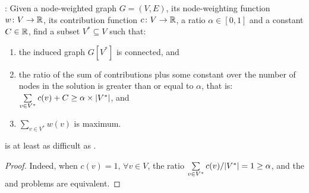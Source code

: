		\textbf{\rbmwcs{}}: Given a node-weighted graph $G = (V, E)$, its node-weighting function $w\colon V \to \mathbb{R}$, its contribution function $c\colon V \to \mathbb{R}$, a ratio $\alpha \in [0,1]$ and a constant $C \in \mathbb{R}$, find a subset $V^* \subseteq V$ such that:
			\begin{enumerate}
				\item the induced graph $G\left[V^*\right]$ is connected, and
				\item the ratio of the sum of contributions plus some constant over the number of nodes in the solution is greater than or equal to $\alpha$, that is:\\
					$\sum\limits_{v \in V^*}{c(v)} + C \geq \alpha\times\lvert V^*\rvert$, and
				\item $\sum\limits_{v \in V^*}{w(v)}$ is maximum.
			\end{enumerate}

		\begin{proposition}
			\rbmwcs{} is at least as difficult as \mwcs{}.
		\end{proposition}
		\begin{proof}
			Indeed, when $c(v) = 1,\,\forall v\in V$, the ratio $\sum\limits_{v \in V^*}{c(v)} / \lvert V^*\rvert = 1 \geq \alpha$, and the \mwcs{} and \rbmwcs{} problems are equivalent.
		\end{proof}

